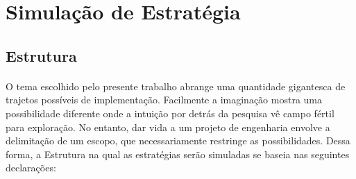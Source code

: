 \section{Simulação de Estratégia}

\subsection{Estrutura}
\label{sub:estrutura}

\paragraph{} O tema escolhido pelo presente trabalho abrange uma quantidade gigantesca de trajetos possíveis de implementação. Facilmente a imaginação mostra uma possibilidade diferente onde a intuição por detrás da pesquisa vê campo fértil para exploração. No entanto, dar vida a um projeto de engenharia envolve a delimitação de um escopo, que necessariamente restringe as possibilidades. Dessa forma, a Estrutura na qual as estratégias serão simuladas se baseia nas seguintes declarações:


